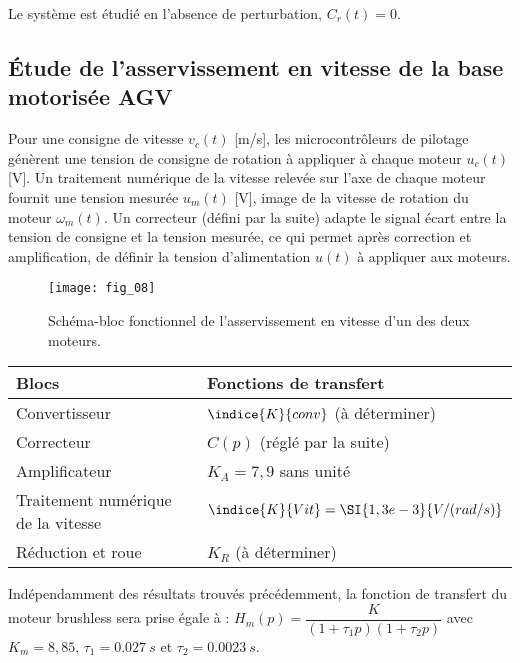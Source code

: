 Le système est étudié en l’absence de perturbation, $C_r(t) = 0$.




\subsection*{Étude de l’asservissement en vitesse de la base motorisée AGV}

Pour une consigne de vitesse $v_c(t)$ [m/s], les microcontrôleurs de pilotage génèrent une tension de
consigne de rotation à appliquer à chaque moteur $u_c(t)$ [V]. Un traitement numérique de la vitesse
relevée sur l’axe de chaque moteur fournit une tension mesurée $u_m(t)$ [V], image de la vitesse de
rotation du moteur $\omega_m(t)$. Un correcteur (défini par la suite) adapte le signal écart entre la tension de
consigne et la tension mesurée, ce qui permet après correction et amplification, de définir la tension
d’alimentation $u(t)$ à appliquer aux moteurs.

\begin{figure}[!h]
\centering
\texttt{[image: fig\_08]}
\caption{\label{fig:08}  Schéma-bloc fonctionnel de l’asservissement en vitesse d’un des deux moteurs.}
\end{figure}


\begin{table}[!h]
\centering
\begin{tabular}{ll}
\hline
\textbf{Blocs} & \textbf{Fonctions de transfert} \\
\hline
Convertisseur 		& $\indice{K}{conv}$  (à déterminer)\\
Correcteur		& $C(p)$ (réglé par la suite) \\
Amplificateur		& $K_A = 7,9$ sans unité \\
Traitement numérique de la vitesse 	& $\indice{K}{Vit} = \SI{1,3e-3}{V/(rad/s)}$ \\
Réduction et roue 	& $K_R$ (à déterminer) \\
\hline
\end{tabular}
\end{table}

Indépendamment des résultats trouvés précédemment, la fonction de transfert du moteur brushless
sera prise égale à : 
$H_m(p)=\dfrac{K}{\left(1+\tau_1 p \right)\left(1+\tau_2 p \right)}$ avec $K_m = 8,85$, 
$\tau_1 = \SI{0,027}{s}$ et $\tau_2 = \SI{0,0023}{s}$.



